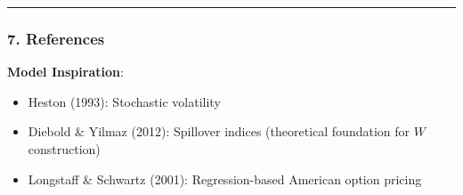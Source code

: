 \documentclass[
]{article}
\providecommand{\tightlist}{%
  \setlength{\itemsep}{0pt}\setlength{\parskip}{0pt}}
\begin{document}
\begin{center}\rule{0.5\linewidth}{0.5pt}\end{center}

\subsubsection{7. References}\label{references}

\textbf{Model Inspiration}:

\begin{itemize}
\tightlist
\item
  Heston (1993): Stochastic volatility
\item
  Diebold \& Yilmaz (2012): Spillover indices (theoretical foundation
  for \(W\) construction)
\item
  Longstaff \& Schwartz (2001): Regression-based American option pricing
\end{itemize}
\end{document}
